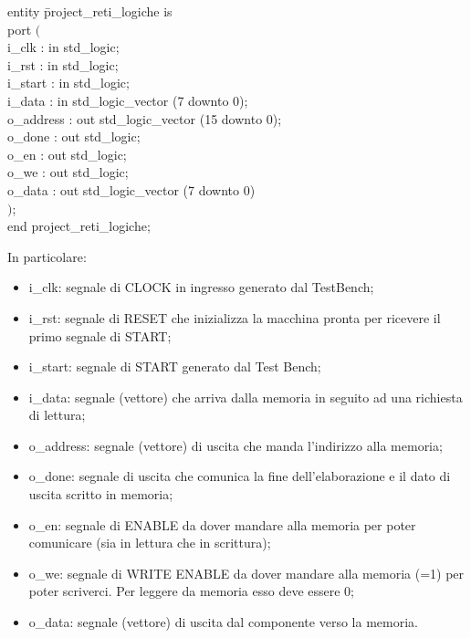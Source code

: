\documentclass[12pt, table, xcdraw]{article}
\begin{document}
\begin{tabbing}
entity \= project\_reti\_logiche is \\
	\> port $($ \= \\
		\>\> i\_clk : in std\_logic; \\
		\>\> i\_rst : in std\_logic; \\
		\>\> i\_start : in std\_logic; \\ 
		\>\> i\_data : in std\_logic\_vector (7 downto 0); \\ 
		\>\> o\_address : out std\_logic\_vector (15 downto 0); \\ 
		\>\> o\_done : out std\_logic; \\
		\>\> o\_en : out std\_logic; \\ 
		\>\> o\_we : out std\_logic; \\ 
		\>\> o\_data : out std\_logic\_vector (7 downto 0) \\
	\>$)$; \\
end project\_reti\_logiche; \\

\end{tabbing}
In particolare:
\begin{itemize}
\item i\_clk: segnale di CLOCK in ingresso generato dal TestBench;
\item i\_rst: segnale di RESET che inizializza la macchina pronta per ricevere il primo
segnale di START;
\item i\_start: segnale di START generato dal Test Bench;
\item i\_data: segnale (vettore) che arriva dalla memoria in seguito ad una richiesta di
lettura;
\item o\_address: segnale (vettore) di uscita che manda l’indirizzo alla memoria;
\item o\_done: segnale di uscita che comunica la fine dell’elaborazione e il dato di uscita
scritto in memoria;
\item o\_en: segnale di ENABLE da dover mandare alla memoria per poter comunicare
(sia in lettura che in scrittura);
\item o\_we: segnale di WRITE ENABLE da dover mandare alla memoria (=1) per poter
scriverci. Per leggere da memoria esso deve essere 0;
\item o\_data: segnale (vettore) di uscita dal componente verso la memoria.


\end{itemize}
\end{document}
